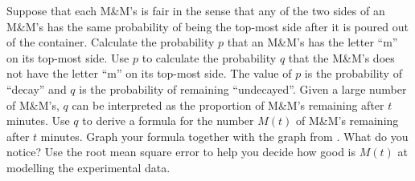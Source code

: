 \documentclass[a4paper,oneside,12pt]{article}
\begin{document}
\begin{exercise}
\begin{packedenum}
\item\label{subex:exponential:MnM_probability}
  Suppose that each M\&M's is fair in the sense that any of the two
  sides of an M\&M's has the same probability of being the top-most
  side after it is poured out of the container.  Calculate the
  probability $p$ that an M\&M's has the letter ``m'' on its top-most
  side.  Use $p$ to calculate the probability $q$ that the M\&M's does
  not have the letter ``m'' on its top-most side.  The value of $p$ is
  the probability of ``decay'' and $q$ is the probability of remaining
  ``undecayed''.  Given a large number of M\&M's, $q$ can be
  interpreted as the proportion of M\&M's remaining after $t$
  minutes.  Use $q$ to derive a formula for the number $M(t)$ of
  M\&M's remaining after $t$ minutes.  Graph your formula together
  with the graph from .  What do you
  notice?  Use the root mean square error to help you decide how good
  is $M(t)$ at modelling the experimental data.
\end{packedenum}
\end{exercise}
\end{document}
